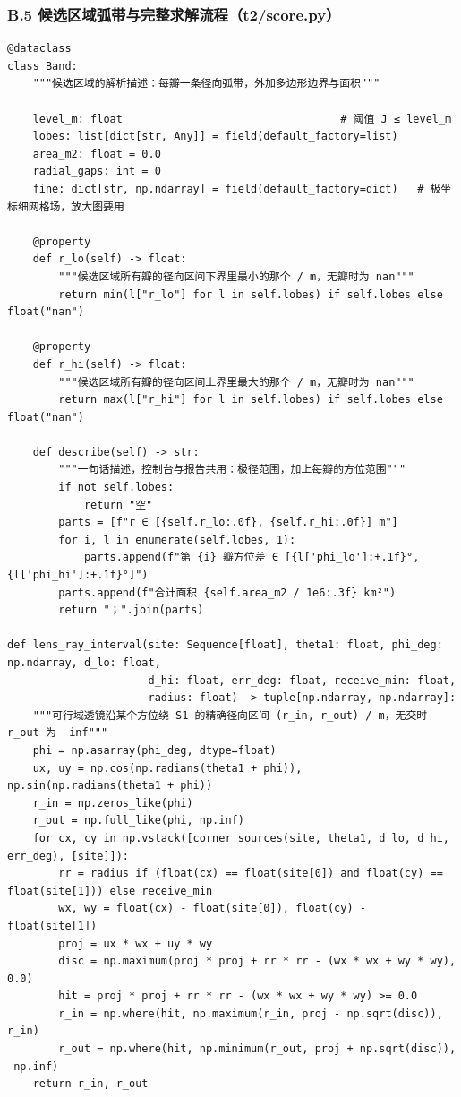 \documentclass[UTF8, zihao=5,AutoFakeBold=2]{ctexart}
\begin{document}
	\subsubsection*{B.5 \quad 候选区域弧带与完整求解流程（t2/score.py）}
	\begin{lstlisting}
@dataclass
class Band:
    """候选区域的解析描述：每瓣一条径向弧带，外加多边形边界与面积"""

    level_m: float                                  # 阈值 J ≤ level_m
    lobes: list[dict[str, Any]] = field(default_factory=list)
    area_m2: float = 0.0
    radial_gaps: int = 0
    fine: dict[str, np.ndarray] = field(default_factory=dict)   # 极坐标细网格场，放大图要用

    @property
    def r_lo(self) -> float:
        """候选区域所有瓣的径向区间下界里最小的那个 / m，无瓣时为 nan"""
        return min(l["r_lo"] for l in self.lobes) if self.lobes else float("nan")

    @property
    def r_hi(self) -> float:
        """候选区域所有瓣的径向区间上界里最大的那个 / m，无瓣时为 nan"""
        return max(l["r_hi"] for l in self.lobes) if self.lobes else float("nan")

    def describe(self) -> str:
        """一句话描述，控制台与报告共用：极径范围，加上每瓣的方位范围"""
        if not self.lobes:
            return "空"
        parts = [f"r ∈ [{self.r_lo:.0f}, {self.r_hi:.0f}] m"]
        for i, l in enumerate(self.lobes, 1):
            parts.append(f"第 {i} 瓣方位差 ∈ [{l['phi_lo']:+.1f}°, {l['phi_hi']:+.1f}°]")
        parts.append(f"合计面积 {self.area_m2 / 1e6:.3f} km²")
        return "；".join(parts)

def lens_ray_interval(site: Sequence[float], theta1: float, phi_deg: np.ndarray, d_lo: float,
                      d_hi: float, err_deg: float, receive_min: float,
                      radius: float) -> tuple[np.ndarray, np.ndarray]:
    """可行域透镜沿某个方位绕 S1 的精确径向区间 (r_in, r_out) / m，无交时 r_out 为 -inf"""
    phi = np.asarray(phi_deg, dtype=float)
    ux, uy = np.cos(np.radians(theta1 + phi)), np.sin(np.radians(theta1 + phi))
    r_in = np.zeros_like(phi)
    r_out = np.full_like(phi, np.inf)
    for cx, cy in np.vstack([corner_sources(site, theta1, d_lo, d_hi, err_deg), [site]]):
        rr = radius if (float(cx) == float(site[0]) and float(cy) == float(site[1])) else receive_min
        wx, wy = float(cx) - float(site[0]), float(cy) - float(site[1])
        proj = ux * wx + uy * wy
        disc = np.maximum(proj * proj + rr * rr - (wx * wx + wy * wy), 0.0)
        hit = proj * proj + rr * rr - (wx * wx + wy * wy) >= 0.0
        r_in = np.where(hit, np.maximum(r_in, proj - np.sqrt(disc)), r_in)
        r_out = np.where(hit, np.minimum(r_out, proj + np.sqrt(disc)), -np.inf)
    return r_in, r_out


\end{lstlisting}
\end{document}
